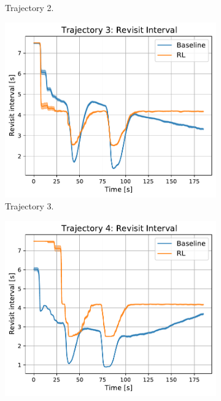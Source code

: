 \documentclass[english, 12pt, a4paper, elec, utf8, a-1b, online]{aaltothesis}
\numberwithin{equation}{section}
\begin{document}
\begin{figure}
\begin{subfigure}[b]{0.45\textwidth}
        \caption{Trajectory 2.}
        \label{fig:RI_T2}
    \end{subfigure}
    \hfill
    \begin{subfigure}[b]{0.45\textwidth}
        \centering
        \includegraphics[width=\linewidth]{figures/benchmark/Simulations/revisit_intervals_2.pdf}
        \caption{Trajectory 3.}
        \label{fig:RI_T3}
    \end{subfigure}
    \hfill
    \begin{subfigure}[b]{0.45\textwidth}
        \centering
        \includegraphics[width=\linewidth]{figures/benchmark/Simulations/revisit_intervals_3.pdf}

\end{subfigure}
\end{figure}
\end{document}
